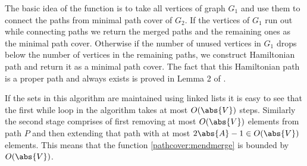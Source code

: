 The basic idea of the function is to take all vertices of graph $G_1$ and use them to connect the paths from minimal path cover of $G_2$. If the vertices of $G_1$ run out while connecting paths we return the merged paths and the remaining ones as the minimal path cover. Otherwise if the number of unused vertices in $G_1$ drops below the number of vertices in the remaining paths, we construct Hamiltonian path and return it as a minimal path cover. The fact that this Hamiltonian path is a proper path and always exists is proved in Lemma 2 of \cite{olariu}.

If the sets in this algorithm are maintained using linked lists it is easy to see that the first while loop in the algorithm takes at most $O(\abs{V})$ steps. Similarly the second stage comprises of first removing at most $O(\abs{V})$ elements from path $P$ and then extending that path with at most $2\abs{A} - 1 \in O(\abs{V})$ elements. This means that the function \ref{pathcover:mendmerge} is bounded by $O(\abs{V})$.

